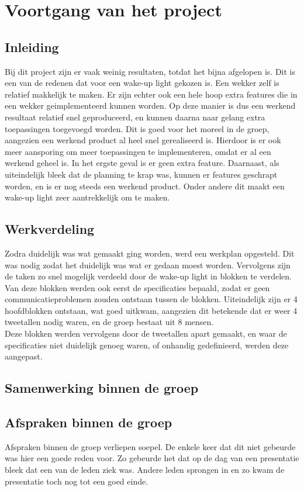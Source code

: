 \chapter{Voortgang van het project}

\section{Inleiding}
Bij dit project zijn er vaak weinig resultaten, totdat het bijna afgelopen is. 
Dit is een van de redenen dat voor een wake-up light gekozen is.
Een wekker zelf is relatief makkelijk te maken. 
Er zijn echter ook een hele hoop extra features die in een wekker geimplementeerd kunnen worden. 
Op deze manier is dus een werkend resultaat relatief snel geproduceerd, en kunnen daarna naar gelang extra toepassingen toegevoegd worden. 
Dit is goed voor het moreel in de groep, aangezien een werkend product al heel snel gerealiseerd is.
Hierdoor is er ook meer aansporing om meer toepassingen te implementeren, omdat er al een werkend geheel is. 
In het ergste geval is er geen extra feature.
Daarnaast, als uiteindelijk bleek dat de planning te krap was, kunnen er features geschrapt worden, en is er nog steeds een werkend product. 
Onder andere dit maakt een wake-up light zeer aantrekkelijk om te maken.

\section{Werkverdeling}
Zodra duidelijk was wat gemaakt ging worden, werd een werkplan opgesteld.
Dit was nodig zodat het duidelijk was wat er gedaan moest worden.
Vervolgens zijn de taken zo snel mogelijk verdeeld door de wake-up light in blokken te verdelen. 
Van deze blokken werden ook eerst de specificaties bepaald, zodat er geen communicatieproblemen zouden ontstaan tussen de blokken.
Uiteindelijk zijn er 4 hoofdblokken ontstaan, wat goed uitkwam, aangezien dit betekende dat er weer 4 tweetallen nodig waren, en de groep bestaat uit 8 mensen. \\
Deze blokken werden vervolgens door de tweetallen apart gemaakt, en waar de specificaties niet duidelijk genoeg waren, of onhandig gedefinieerd, werden deze aangepast. 


\section{Samenwerking binnen de groep}


\section{Afspraken binnen de groep}
Afspraken binnen de groep verliepen soepel. De enkele keer dat dit niet gebeurde was hier een goede reden voor. Zo gebeurde het dat op de dag van een presentatie bleek dat een van de leden ziek was. Andere leden sprongen in en zo kwam de presentatie toch nog tot een goed einde.